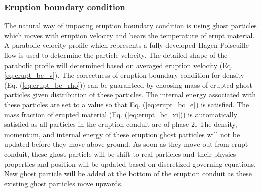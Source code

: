 \documentclass[journal abbreviation, manuscript]{copernicus}
\begin{document}
\subsubsection{Eruption boundary condition}
The natural way of imposing eruption boundary condition is using ghost particles which moves with eruption velocity and bears the temperature of erupt material. A parabolic velocity profile which represents a fully developed Hagen-Poiseuille flow is used to determine the particle velocity. The detailed shape of the parabolic profile will determined based on averaged eruption velocity (Eq. \ref{eq:erupt_bc_v}). The correctness of eruption boundary condition for density (Eq. (\ref{eq:erupt_bc_rho})) can be guaranteed by choosing mass of erupted ghost particles given distribution of these particles. The internal energy associated with these particles are set to a value so that Eq. (\ref{eq:erupt_bc_e}) is satisfied. The mass fraction of erupted material (Eq. (\ref{eq:erupt_bc_xi})) is automatically satisfied as all particles in the eruption conduit are of phase 2. The density, momentum, and internal energy of these eruption ghost particles will not be updated before they move above ground. As soon as they move out from erupt conduit, these ghost particle will be shift to real particles and their physics properties and position will be updated based on discretized governing equations. New ghost particle will be added at the bottom of the eruption conduit as these existing ghost particles move upwards.\\
\end{document}
